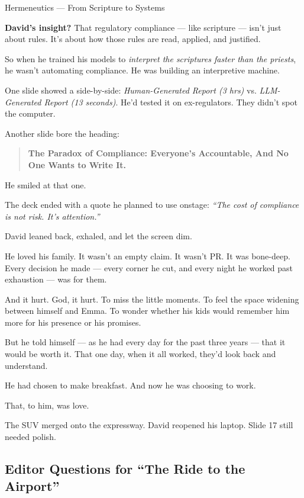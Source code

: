 \begin{PhilosophicalSidebar}{Hermeneutics --- From Scripture to Systems}
    \medskip
    
    \textbf{David’s insight?}  
    That regulatory compliance --- like scripture --- isn’t just about rules.  
    It’s about how those rules are read, applied, and justified.
    
    \medskip
    
    So when he trained his models to \textit{interpret the scriptures faster than the priests},  
    he wasn’t automating compliance.  
    He was building an interpretive machine.
    
\end{PhilosophicalSidebar}

\medskip


One slide showed a side-by-side:
\textit{Human-Generated Report (3 hrs)} vs. \textit{LLM-Generated Report (13 seconds)}.
He’d tested it on ex-regulators. 
They didn’t spot the computer.

Another slide bore the heading:

\begin{quote}
    \centering
    \textbf{The Paradox of Compliance: Everyone’s Accountable, And No One Wants to Write It.}
\end{quote}

He smiled at that one.

The deck ended with a quote he planned to use onstage:
\textit{“The cost of compliance is not risk. It’s attention.”}

David leaned back, exhaled, and let the screen dim.

He loved his family.
It wasn’t an empty claim. 
It wasn’t PR. 
It was bone-deep.
Every decision he made --- every corner he cut, and every night he worked past exhaustion --- was for them.

And it hurt. 
God, it hurt.
To miss the little moments. 
To feel the space widening between himself and Emma.
To wonder whether his kids would remember him more for his presence or his promises.

But he told himself --- as he had every day for the past three years --- that it would be worth it.
That one day, when it all worked, they’d look back and understand.

He had chosen to make breakfast.
And now he was choosing to work.

That, to him, was love.

The SUV merged onto the expressway.
David reopened his laptop.
Slide 17 still needed polish.

\subsection*{Editor Questions for ``The Ride to the Airport''}

